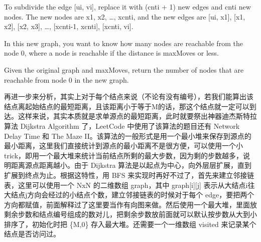 \documentclass[9pt, b5paaper]{book}
\begin{document}
To subdivide the edge [ui, vi], replace it with (cnti + 1) new edges and cnti new nodes. The new nodes are x1, x2, \ldots{}, xcnti, and the new edges are [ui, x1], [x1, x2], [x2, x3], \ldots{}, [xcnti-1, xcnti], [xcnti, vi].

In this new graph, you want to know how many nodes are reachable from the node 0, where a node is reachable if the distance is maxMoves or less.

Given the original graph and maxMoves, return the number of nodes that are reachable from node 0 in the new graph.

再进一步来分析，其实上对于每个结点来说（不论有没有编号），若我们能算出该结点离起始结点的最短距离，且该距离小于等于M的话，那这个结点就一定可以到达。这样来说，其实本质就是求单源点的最短距离，此时就要祭出神器迪杰斯特拉算法 Dijkstra Algorithm 了，LeetCode 中使用了该算法的题目还有 Network Delay Time 和 The Maze II。该算法的一般形式是用一个最小堆来保存到源点的最小距离，这里我们直接统计到源点的最小距离不是很方便，可以使用一个小 trick，即用一个最大堆来统计当前结点所剩的最大步数，因为剩的步数越多，说明距离源点距离越小。由于 Dijkstra 算法是以起点为中心，向外层层扩展，直到扩展到终点为止。根据这特性，用 BFS 来实现时再好不过了，首先来建立邻接链表，这里可以使用一个 NxN 的二维数组 graph，其中 graph[i][j] 表示从大结点i往大结点j方向会经过的小结点个数，建立邻接链表的时候对于每个 edge，要把两个方向都赋值，前面解释过了这里要当作有向图来做。然后使用一个最大堆，里面放剩余步数和结点编号组成的数对儿，把剩余步数放前面就可以默认按步数从大到小排序了，初始化时把 \{M,0\} 存入最大堆。还需要一个一维数组 visited 来记录某个结点是否访问过。
\end{document}

